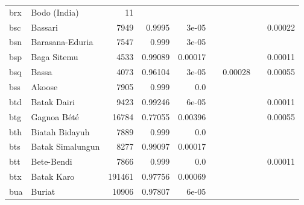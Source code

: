 \documentclass[11pt]{article}
\begin{document}
\begin{table*}[h]
{\begin{tabular}{llrrrrrrr}
brx         & Bodo (India)         & 11         &          &          &          &          &          &          \\

bsc         & Bassari         & 7949         & 0.9995         & 3e-05         &          &          &          & 0.00022         \\

bsn         & Barasana-Eduria         & 7547         & 0.999         & 3e-05         &          &          &          &          \\

bsp         & Baga Sitemu         & 4533         & 0.99089         & 0.00017         &          &          &          & 0.00011         \\

bsq         & Bassa         & 4073         & 0.96104         & 3e-05         &          & 0.00028         &          & 0.00055         \\

bss         & Akoose         & 7905         & 0.999         & 0.0         &          &          &          &          \\

btd         & Batak Dairi         & 9423         & 0.99246         & 6e-05         &          &          &          & 0.00011         \\

btg         & Gagnoa Bété         & 16784         & 0.77055         & 0.00396         &          &          &          & 0.00055         \\

bth         & Biatah Bidayuh         & 7889         & 0.999         & 0.0         &          &          &          &          \\

bts         & Batak Simalungun         & 8277         & 0.99097         & 0.00017         &          &          &          &          \\

btt         & Bete-Bendi         & 7866         & 0.999         & 0.0         &          &          &          & 0.00011         \\

btx         & Batak Karo         & 191461         & 0.97756         & 0.00069         &          &          &          &          \\

bua         & Buriat         & 10906         & 0.97807         & 6e-05         &          &          &          &          \\


\end{tabular}}
\end{table*}
\end{document}
